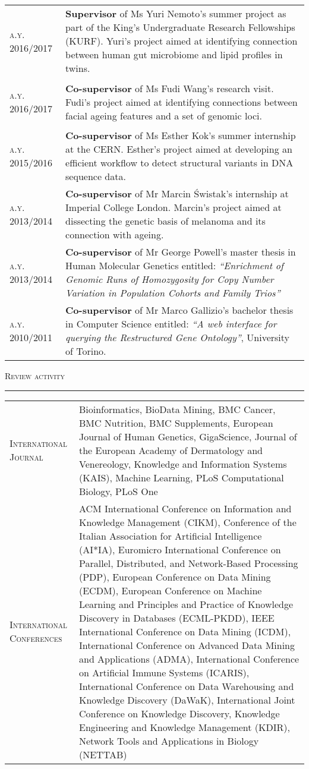 \documentclass[a4paper,10pt]{article}
\newcommand{\mediumtitle}[1]{
	\vspace{0.2cm}
	{\noindent
	\Large \textsc{#1}\\[-2ex]
	\hrule
	\vspace{0.2cm}}
}
\newenvironment{doubletablelist}
{
	\vspace{-0.2cm}
	\begin{longtable}[!h]{AB}}{\end{longtable}
}
\newcommand{\dtlist}[2]{
\hspace{-3cm}
\noindent
	\begin{minipage}{0.24\textwidth}
	\begin{flushright}
	\textsc{#1}
	\end{flushright}
	\end{minipage}
	& #2\\[0.2cm]
}
\newcommand{\minusitem}{\item[-]}
\begin{document}
\begin{doubletablelist}
	\dtlist{a.y. 2016/2017}{\textbf{Supervisor} of Ms Yuri Nemoto's summer project as part of the King's Undergraduate Research Fellowships (KURF). Yuri's project aimed at identifying connection between human gut microbiome and lipid profiles in twins.}
	\dtlist{a.y. 2016/2017}{\textbf{Co-supervisor} of Ms Fudi Wang's research visit. Fudi's project aimed at identifying connections between facial ageing features and a set of genomic loci.}
	\dtlist{a.y. 2015/2016}{\textbf{Co-supervisor} of Ms Esther Kok's summer internship at the CERN. Esther's project aimed at developing an efficient workflow to detect structural variants in DNA sequence data.}
	\dtlist{a.y. 2013/2014}{\textbf{Co-supervisor} of Mr Marcin \'Swistak's internship at Imperial College London. Marcin's project aimed at dissecting the genetic basis of melanoma and its connection with ageing.}
	\dtlist{a.y. 2013/2014}{\textbf{Co-supervisor} of Mr George Powell's master thesis in Human Molecular Genetics entitled: \emph{``Enrichment of Genomic Runs of Homozygosity for Copy Number Variation in Population Cohorts and Family Trios''}}
	\dtlist{a.y. 2010/2011}{\textbf{Co-supervisor} of Mr Marco Gallizio's bachelor thesis in Computer Science entitled: \emph{``A web interface for querying the Restructured Gene Ontology''}, University of Torino.}
\end{doubletablelist}	



\mediumtitle{Review activity}
\begin{doubletablelist}
\dtlist{International Journal}{
		Bioinformatics, BioData Mining, BMC Cancer, BMC Nutrition, BMC Supplements, European Journal of Human Genetics, GigaScience, Journal of the European Academy of Dermatology and Venereology, Knowledge and Information Systems (KAIS), Machine Learning, PLoS Computational Biology, PLoS One
	}
\dtlist{International Conferences}{
	ACM International Conference on Information and Knowledge Management (CIKM), Conference of the Italian Association for Artificial Intelligence (AI*IA), Euromicro International Conference on Parallel, Distributed, and Network-Based Processing (PDP),  European Conference on Data Mining (ECDM),  European Conference on Machine Learning and Principles and Practice of Knowledge Discovery in Databases (ECML-PKDD),  IEEE International Conference on Data Mining (ICDM),  International Conference on Advanced Data Mining and Applications (ADMA),  International Conference on Artificial Immune Systems (ICARIS), International Conference on Data Warehousing and Knowledge Discovery (DaWaK),  International Joint Conference on Knowledge Discovery, Knowledge Engineering and Knowledge Management (KDIR),  Network Tools and Applications in Biology (NETTAB)
}
\end{doubletablelist}
\end{document}
